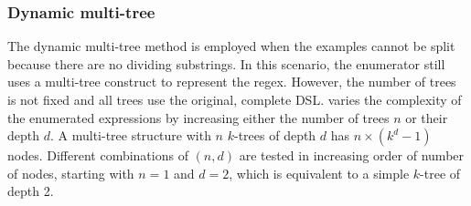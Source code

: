 \subsubsection{Dynamic multi-tree}\label{sec:dynamic-multi-tree} The dynamic multi-tree method is employed when the examples cannot be split because there are no dividing substrings.
In this scenario, the enumerator still uses a multi-tree construct to represent the regex. However, the number of trees is not fixed and all trees use the original, complete DSL. 
\Forest{} varies the complexity of the enumerated expressions by increasing either the number of trees \(n\) or their depth \(d\).
A multi-tree structure with \(n\) \(k\)-trees of depth \(d\) has \(n \times (k^d - 1)\) nodes.
Different combinations of \((n, d)\) are tested in increasing order of number of nodes, starting with \(n = 1\) and \(d = 2\), which is equivalent to a simple \(k\)-tree of depth 2.

